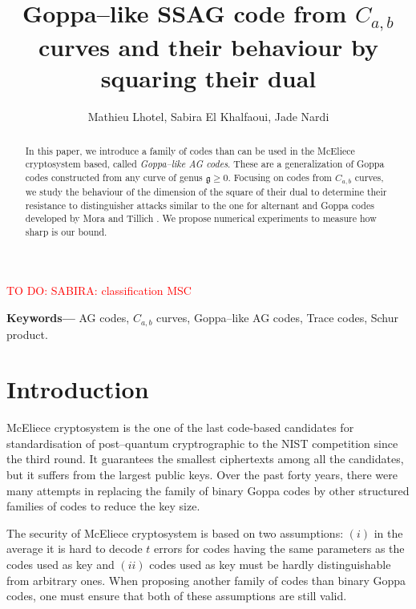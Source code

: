 \documentclass[a4paper]{article}
\title{Goppa--like SSAG code from $C_{a,b}$ curves and their behaviour by squaring their dual}
\author{Mathieu Lhotel, Sabira El Khalfaoui, Jade Nardi}
\date{}
\theoremstyle{definition}
\theoremstyle{remark}
\newcommand\TODO[1]{\textcolor{red}{TO DO: #1}}
\providecommand{\keywords}[1]{\textbf{Keywords---} #1}
\begin{document}

\maketitle

\TODO{SABIRA: classification MSC}

\begin{abstract}
In this paper, we introduce a family of codes than can be used in the McEliece cryptosystem based, called \emph{Goppa--like AG codes}. These are a generalization of Goppa codes constructed from any curve of genus $\mathfrak{g} \geq 0$. Focusing on codes from $C_{a,b}$ curves, we study the behaviour of the dimension of the square of their dual to determine their resistance to distinguisher attacks similar to the one for alternant and Goppa codes developed by Mora and Tillich \cite{MT21}. We propose numerical experiments to measure how sharp is our bound.
\end{abstract}
	
\keywords{AG codes, $C_{a,b}$ curves, Goppa--like AG codes, Trace codes, Schur product.}

\section*{Introduction}

McEliece cryptosystem is the one of the last code-based candidates for standardisation of post--quantum cryptrographic to the NIST competition since the third round. It guarantees the smallest ciphertexts among all the candidates, but it suffers from the largest public keys. Over the past forty years, there were many attempts in replacing the family of binary Goppa codes by other structured families of codes to reduce the key size.

The security of McEliece cryptosystem is based on two assumptions: $(i)$ in the average it is hard to decode $t$ errors for codes having the same parameters as the codes used as key and $(ii)$ codes used as key must be hardly distinguishable from arbitrary ones. When proposing another family of codes than binary Goppa codes, one must ensure that both of these assumptions are still valid.
\end{document}
